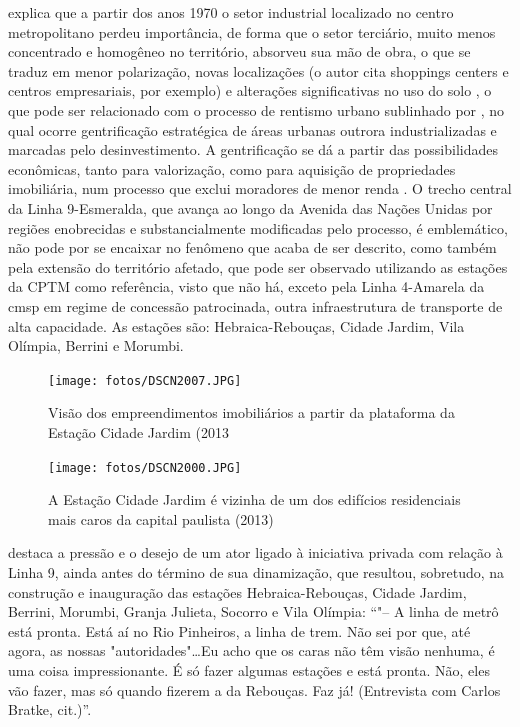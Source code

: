 	 explica que a partir dos anos 1970 o setor industrial localizado no centro metropolitano perdeu importância, de forma que o setor terciário, muito menos concentrado e homogêneo no território, absorveu sua mão de obra, o que se traduz em menor polarização, novas localizações (o autor cita shoppings centers e centros empresariais, por exemplo) e alterações significativas no uso do solo , o que pode ser relacionado com o processo de rentismo urbano sublinhado por , no qual ocorre gentrificação estratégica de áreas urbanas outrora industrializadas e marcadas pelo desinvestimento. A gentrificação se dá a partir das possibilidades econômicas, tanto para valorização, como para aquisição de propriedades imobiliária, num processo que exclui moradores de menor renda . O trecho central da Linha 9-Esmeralda, que avança ao longo da Avenida das Nações Unidas por regiões enobrecidas e substancialmente modificadas pelo processo, é emblemático, não pode por se encaixar no fenômeno que acaba de ser descrito, como também pela extensão do território afetado, que pode ser observado utilizando as estações da CPTM como referência, visto que não há, exceto pela Linha 4-Amarela da \gls{cmsp} em regime de concessão patrocinada, outra infraestrutura de transporte de alta capacidade. As estações são: Hebraica-Rebouças, Cidade Jardim, Vila Olímpia, Berrini e Morumbi.
	
	\begin{figure}[h]
		\caption{Visão dos empreendimentos imobiliários a partir da plataforma da Estação Cidade Jardim (2013}
		\texttt{[image: fotos/DSCN2007.JPG]}
	\end{figure}
	
	\begin{figure}[h]
		\caption{A Estação Cidade Jardim é vizinha de um dos edifícios residenciais mais caros da capital paulista (2013)\cite{apecaro}}
		\texttt{[image: fotos/DSCN2000.JPG]}
	\end{figure}	
	
	 destaca a pressão e o desejo de um ator ligado à iniciativa privada com relação à Linha 9, ainda antes do término de sua dinamização, que resultou, sobretudo, na construção e inauguração das estações Hebraica-Rebouças, Cidade Jardim, Berrini, Morumbi, Granja Julieta, Socorro e Vila Olímpia\cite[pág. 38]{Ferreira}: ``"-- A linha de metrô está pronta. Está aí no Rio Pinheiros, a linha de trem. Não sei por que, até agora, as nossas "autoridades"\dots Eu acho que os caras não têm visão nenhuma, é uma coisa impressionante. É só fazer algumas estações e está pronta. Não, eles vão fazer, mas só quando fizerem a da Rebouças. Faz já! (Entrevista com Carlos Bratke, cit.)''.
	
